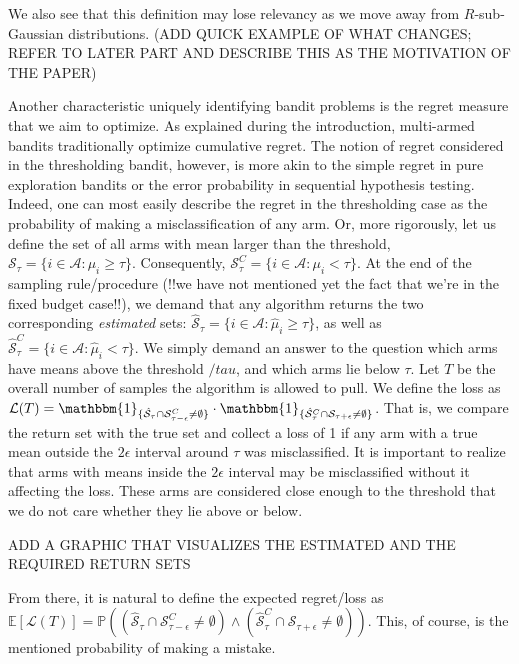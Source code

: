 \documentclass[12pt,]{article}
\begin{document}
We also see that this definition may lose relevancy as we move away from
\(R\)-sub-Gaussian distributions. (ADD QUICK EXAMPLE OF WHAT CHANGES;
REFER TO LATER PART AND DESCRIBE THIS AS THE MOTIVATION OF THE PAPER)

Another characteristic uniquely identifying bandit problems is the
regret measure that we aim to optimize. As explained during the
introduction, multi-armed bandits traditionally optimize cumulative
regret. The notion of regret considered in the thresholding bandit,
however, is more akin to the simple regret in pure exploration bandits
or the error probability in sequential hypothesis testing. Indeed, one
can most easily describe the regret in the thresholding case as the
probability of making a misclassification of any arm. Or, more
rigorously, let us define the set of all arms with mean larger than the
threshold,
\(\mathcal{S}_\tau = \{i \in \mathcal{A}: \mu_i \geq \tau\}\).
Consequently,
\(\mathcal{S}_\tau^C = \{i \in \mathcal{A}: \mu_i < \tau\}\). At the end
of the sampling rule/procedure (!!we have not mentioned yet the fact
that we're in the fixed budget case!!), we demand that any algorithm
returns the two corresponding \emph{estimated} sets:
\(\hat{\mathcal{S}}_{\tau} = \{i \in \mathcal{A}: \hat{\mu}_i \geq \tau\}\),
as well as
\(\hat{\mathcal{S}}_{\tau}^C = \{i \in \mathcal{A}: \hat{\mu}_i < \tau\}\).
We simply demand an answer to the question which arms have means above
the threshold \(/tau\), and which arms lie below \(\tau\). Let \(T\) be
the overall number of samples the algorithm is allowed to pull. We
define the loss as
\(\mathcal{L}(T) = \mathbbm{1}_{\{\hat{\mathcal{S}}_{\tau} \cap \mathcal{S}_{\tau-\epsilon}^C \neq \emptyset\}} \cdot \mathbbm{1}_{\{\hat{\mathcal{S}}_{\tau}^C \cap \mathcal{S}_{\tau+\epsilon} \neq \emptyset\}}\).
That is, we compare the return set with the true set and collect a loss
of 1 if any arm with a true mean outside the \(2\epsilon\) interval
around \(\tau\) was misclassified. It is important to realize that arms
with means inside the \(2 \epsilon\) interval may be misclassified
without it affecting the loss. These arms are considered close enough to
the threshold that we do not care whether they lie above or below.

ADD A GRAPHIC THAT VISUALIZES THE ESTIMATED AND THE REQUIRED RETURN SETS

From there, it is natural to define the expected regret/loss as
\(\mathbb{E}[\mathcal{L}(T)] = \mathbb{P}((\hat{\mathcal{S}}_{\tau} \cap \mathcal{S}_{\tau-\epsilon}^C \neq \emptyset) \land (\hat{\mathcal{S}}_{\tau}^C \cap \mathcal{S}_{\tau+\epsilon} \neq \emptyset))\).
This, of course, is the mentioned probability of making a mistake.
\end{document}
